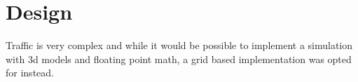 \section{Design}

\par
Traffic is very complex and while it would be possible to implement a simulation with 3d models and floating point math, a grid based implementation was opted for instead.


